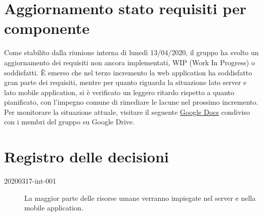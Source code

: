 \documentclass{article}
\begin{document}
\section{Aggiornamento stato requisiti per componente}%
\label{sec:aggiornamento_stato_requisiti_per_componente}

Come stabilito dalla riunione interna di lunedì 13/04/2020, il gruppo ha svolto un aggiornamento dei requisiti non ancora implementati, WIP (Work In Progress) o soddisfatti.
È emerso che nel terzo incremento la web application ha soddisfatto gran parte dei requisiti, mentre per quanto riguarda la situazione lato server e lato mobile application, si è verificato un leggero ritardo rispetto a quanto pianificato, con l'impegno comune di rimediare le lacune nel prossimo incremento.
Per monitorare la situazione attuale, visitare il seguente \href{https://docs.google.com/spreadsheets/d/1J-RbNrb1yN_X1rVlKzpP9rjaiGst8B62k1K6EHY-grU/edit#gid=0}{Google Docs} condiviso con i membri del gruppo su Google Drive.

\newpage
\section{Registro delle decisioni}%
\label{sec:registro_delle_decisioni}

\begin{description}
  \item[20200317-int-001] La maggior parte delle risorse umane verranno impiegate nel server e nella mobile application.
\end{description}


\end{document}
